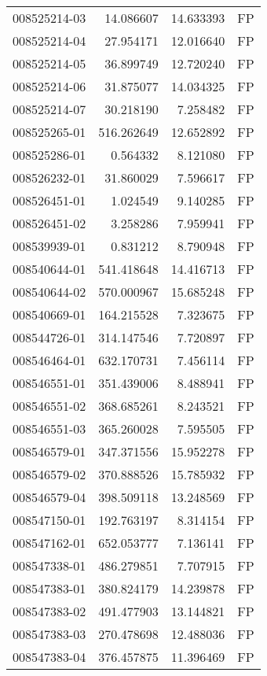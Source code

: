 \begin{tabular}{lrrl}
008525214-03 &   14.086607 &    14.633393 &   FP \\
008525214-04 &   27.954171 &    12.016640 &   FP \\
008525214-05 &   36.899749 &    12.720240 &   FP \\
008525214-06 &   31.875077 &    14.034325 &   FP \\
008525214-07 &   30.218190 &     7.258482 &   FP \\
008525265-01 &  516.262649 &    12.652892 &   FP \\
008525286-01 &    0.564332 &     8.121080 &   FP \\
008526232-01 &   31.860029 &     7.596617 &   FP \\
008526451-01 &    1.024549 &     9.140285 &   FP \\
008526451-02 &    3.258286 &     7.959941 &   FP \\
008539939-01 &    0.831212 &     8.790948 &   FP \\
008540644-01 &  541.418648 &    14.416713 &   FP \\
008540644-02 &  570.000967 &    15.685248 &   FP \\
008540669-01 &  164.215528 &     7.323675 &   FP \\
008544726-01 &  314.147546 &     7.720897 &   FP \\
008546464-01 &  632.170731 &     7.456114 &   FP \\
008546551-01 &  351.439006 &     8.488941 &   FP \\
008546551-02 &  368.685261 &     8.243521 &   FP \\
008546551-03 &  365.260028 &     7.595505 &   FP \\
008546579-01 &  347.371556 &    15.952278 &   FP \\
008546579-02 &  370.888526 &    15.785932 &   FP \\
008546579-04 &  398.509118 &    13.248569 &   FP \\
008547150-01 &  192.763197 &     8.314154 &   FP \\
008547162-01 &  652.053777 &     7.136141 &   FP \\
008547338-01 &  486.279851 &     7.707915 &   FP \\
008547383-01 &  380.824179 &    14.239878 &   FP \\
008547383-02 &  491.477903 &    13.144821 &   FP \\
008547383-03 &  270.478698 &    12.488036 &   FP \\
008547383-04 &  376.457875 &    11.396469 &   FP \\

\end{tabular}
